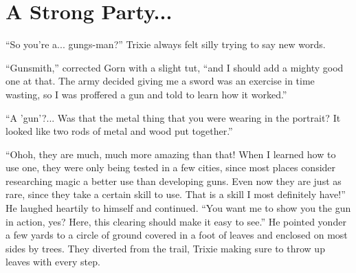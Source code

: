 \scenesep

\section{A Strong Party...}

``So you're a... gungs-man?'' Trixie always felt silly trying to say new words.

``Gunsmith,'' corrected Gorn with a slight tut, ``and I should add a mighty good
one at that. The army decided giving me a sword was an exercise in time wasting,
so I was proffered a gun and told to learn how it worked.''

``A 'gun'?... Was that the metal thing that you were wearing in the portrait? It
looked like two rods of metal and wood put together.''

``Ohoh, they are much, much more amazing than that! When I learned how to use
one, they were only being tested in a few cities, since most places consider
researching magic a better use than developing guns. Even now they are just as
rare, since they take a certain skill to use. That is a skill I most definitely
have!'' He laughed heartily to himself and continued. ``You want me to show you
the gun in action, yes? Here, this clearing should make it easy to see.'' He
pointed yonder a few yards to a circle of ground covered in a foot of leaves and
enclosed on most sides by trees. They diverted from the trail, Trixie making
sure to throw up leaves with every step.
